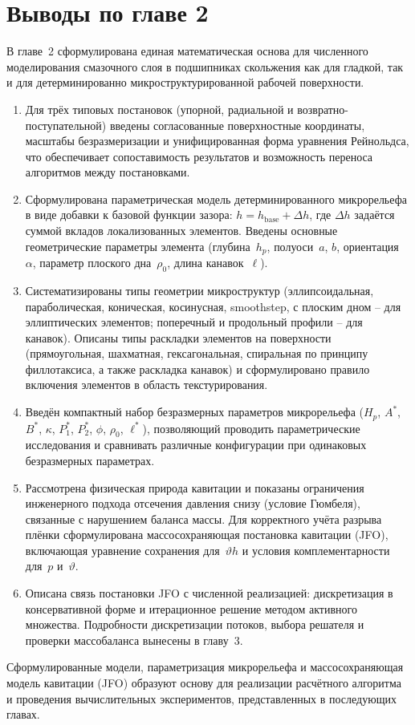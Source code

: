 \FloatBarrier
\section*{Выводы по главе 2}

В главе~2 сформулирована единая математическая основа для численного
моделирования смазочного слоя в подшипниках скольжения как для гладкой,
так и для детерминированно микроструктурированной рабочей поверхности.

\begin{enumerate}[wide, labelindent=\parindent, nosep]
  \item Для трёх типовых постановок (упорной, радиальной
    и возвратно-поступательной) введены согласованные поверхностные
    координаты, масштабы безразмеризации и унифицированная форма
    уравнения Рейнольдса, что обеспечивает сопоставимость результатов
    и возможность переноса алгоритмов между постановками.
  \item Сформулирована параметрическая модель детерминированного
    микрорельефа в виде добавки к базовой функции зазора:
    $h = h_{\mathrm{base}} + \Delta h$, где $\Delta h$ задаётся суммой
    вкладов локализованных элементов.  Введены основные геометрические
    параметры элемента (глубина~$h_p$, полуоси~$a$, $b$,
    ориентация~$\alpha$, параметр плоского дна~$\rho_0$,
    длина канавок~$\ell$).
  \item Систематизированы типы геометрии микроструктур
    (эллипсоидальная, параболическая, коническая, косинусная, smoothstep,
    с плоским дном -- для эллиптических элементов; поперечный
    и продольный профили -- для канавок).
    Описаны типы раскладки элементов на поверхности (прямоугольная,
    шахматная, гексагональная, спиральная по принципу филлотаксиса,
    а также раскладка канавок) и сформулировано правило включения
    элементов в область текстурирования.
  \item Введён компактный набор безразмерных параметров микрорельефа
    ($H_p$, $A^{*}$, $B^{*}$, $\kappa$, $P_1^{*}$, $P_2^{*}$, $\phi$,
    $\rho_0$, $\ell^{*}$), позволяющий проводить параметрические
    исследования и сравнивать различные конфигурации при одинаковых
    безразмерных параметрах.
  \item Рассмотрена физическая природа кавитации и показаны ограничения
    инженерного подхода отсечения давления снизу (условие Гюмбеля),
    связанные с нарушением баланса массы.  Для корректного учёта разрыва
    плёнки сформулирована массосохраняющая постановка кавитации (JFO),
    включающая уравнение
    сохранения для~$\vartheta h$ и условия комплементарности
    для~$p$ и~$\vartheta$.
  \item Описана связь постановки JFO с численной реализацией:
    дискретизация в консервативной форме и итерационное решение методом
    активного множества.  Подробности дискретизации потоков, выбора
    решателя и проверки массобаланса вынесены в главу~3.
\end{enumerate}

Сформулированные модели, параметризация микрорельефа и массосохраняющая
модель кавитации (JFO) образуют основу для реализации расчётного алгоритма
и проведения вычислительных экспериментов, представленных в последующих
главах.
